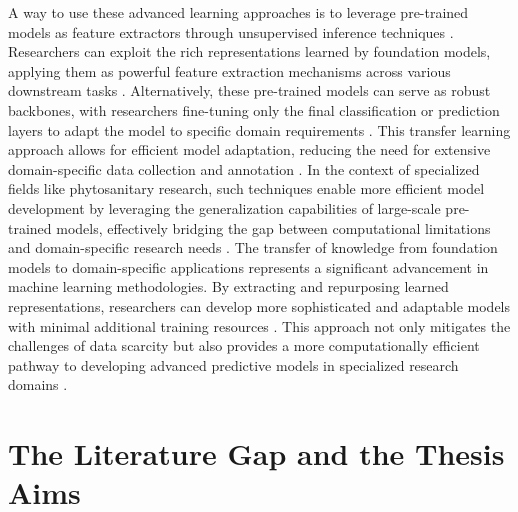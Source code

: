 \documentclass[12pt,a4paper,oneside]{report}
\begin{document}
A way to use these advanced learning approaches is to leverage pre-trained models 
as feature extractors through unsupervised 
inference techniques \cite{chenSimpleFrameworkContrastive2020}. Researchers can exploit the rich 
representations learned by foundation models, 
applying them as powerful feature extraction mechanisms across various downstream 
tasks \cite{devlinBERTPretrainingDeep2019}. Alternatively, 
these pre-trained models can serve as robust backbones, with researchers fine-tuning 
only the final classification or 
prediction layers to adapt the model to specific domain requirements 
\cite{heMomentumContrastUnsupervised2020}. This transfer learning 
approach allows for efficient model adaptation, reducing the need for extensive 
domain-specific data collection and 
annotation \cite{kornblithBetterImageNetModels2019}. In the context of specialized fields like 
phytosanitary research, such 
techniques enable more efficient model development by leveraging the generalization 
capabilities of large-scale 
pre-trained models, effectively bridging the gap between computational limitations 
and domain-specific research 
needs \cite{razavianCNNFeaturesOfftheshelf2014}.
The transfer of knowledge from foundation models to domain-specific applications 
represents a significant advancement 
in machine learning methodologies. By extracting and repurposing learned representations, 
researchers can develop 
more sophisticated and adaptable models with minimal additional training resources 
\cite{zophRethinkingPretrainingSelftraining2020}. 
This approach not only mitigates the challenges of data scarcity but also provides 
a more computationally 
efficient pathway to developing advanced predictive models in specialized research 
domains \cite{tanEfficientNetRethinkingModel2020}.

\section{The Literature Gap and the Thesis Aims}
\end{document}
